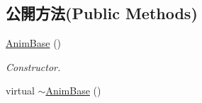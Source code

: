 \subsection*{公開方法(Public Methods)}
\begin{DoxyCompactItemize}
\item 
\hyperlink{class_magnum_1_1_anim_base_a969a9ef36c4fef41b9ea824660248abf}{Anim\+Base} ()\hypertarget{class_magnum_1_1_anim_base_a969a9ef36c4fef41b9ea824660248abf}{}\label{class_magnum_1_1_anim_base_a969a9ef36c4fef41b9ea824660248abf}

\begin{DoxyCompactList}\small\item\em Constructor. \end{DoxyCompactList}\item 
virtual \hyperlink{class_magnum_1_1_anim_base_a1edaa0c3b82c3b5d22a3c9d21a9840b8}{$\sim$\+Anim\+Base} ()\hypertarget{class_magnum_1_1_anim_base_a1edaa0c3b82c3b5d22a3c9d21a9840b8}{}\label{class_magnum_1_1_anim_base_a1edaa0c3b82c3b5d22a3c9d21a9840b8}


\end{DoxyCompactItemize}
